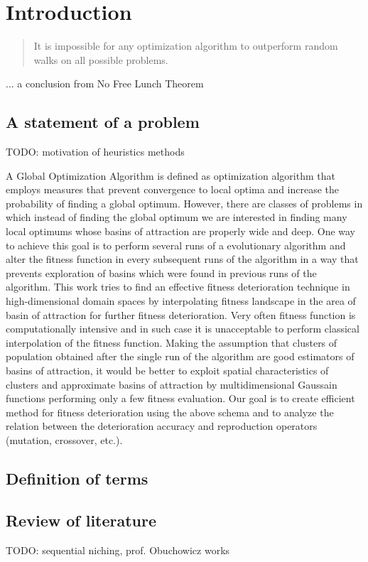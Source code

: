 
\chapter{Introduction}
\label{Introduction} 

\begin{quotation}
 It is impossible for any optimization algorithm to outperform random walks on all possible problems.
\end{quotation}
\begin{flushright}
 ... a conclusion from No Free Lunch Theorem
\end{flushright}

\section{A statement of a problem}

TODO: motivation of heuristics methods

A Global Optimization Algorithm is defined as optimization algorithm that
employs measures that prevent convergence to local
optima and increase the probability of finding a global optimum. However,
there are classes of problems in which
instead of finding the global optimum we are interested in finding many
local optimums whose basins of attraction are properly wide
and deep.
One way to achieve this goal is to perform several runs of a evolutionary
algorithm and alter the fitness function in every subsequent runs of the
algorithm
in a way that prevents exploration of basins which were found in
previous runs of the algorithm.
This work tries to find an effective fitness deterioration technique in
high-dimensional domain spaces by interpolating fitness landscape in the area of
basin of attraction for further fitness deterioration. Very often fitness function is computationally intensive and in such case it
is unacceptable to perform classical interpolation of the fitness function.
Making the assumption that clusters of population obtained after the single
run of the algorithm are good estimators of basins of attraction, it would
be better to exploit spatial characteristics of clusters and approximate
basins of attraction by multidimensional Gaussain functions performing
only a few fitness evaluation. Our goal is to create efficient method for
fitness deterioration using the above schema and to analyze the relation
between the deterioration accuracy and reproduction operators (mutation,
crossover, etc.).

\section{Definition of terms}

\section{Review of literature}
TODO: sequential niching, prof. Obuchowicz works

